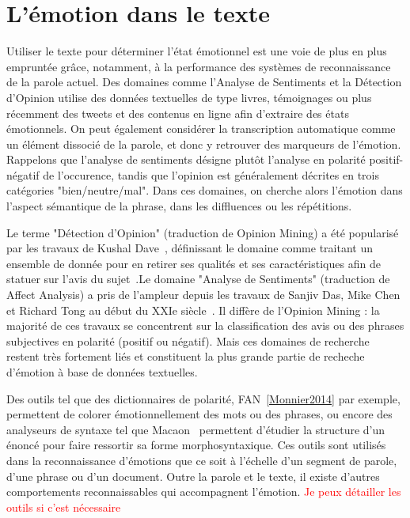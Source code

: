 \section{L'émotion dans le texte}
Utiliser le texte pour déterminer l'état émotionnel est une voie de plus en plus empruntée grâce, notamment, à la performance des systèmes de reconnaissance de la parole actuel.
Des domaines comme l'Analyse de Sentiments et la Détection d'Opinion utilise des données textuelles de type livres, témoignages ou plus récemment des tweets et  des contenus en ligne afin d'extraire des états émotionnels. On peut également considérer la transcription automatique comme un élément dissocié de la parole, et donc y retrouver des marqueurs de l'émotion. Rappelons que l’analyse de sentiments désigne plutôt l’analyse en polarité positif-négatif de l'occurence, tandis que l'opinion est généralement décrites en trois catégories "bien/neutre/mal". Dans ces domaines, on cherche alors l'émotion dans l'aspect sémantique de la phrase, dans les diffluences ou les répétitions.

Le terme "Détection d'Opinion" (traduction de Opinion Mining) a été popularisé par les travaux de Kushal Dave~\cite{Dave2003}, définissant le domaine comme traitant un ensemble de donnée pour en retirer ses qualités et ses caractéristiques afin de statuer sur l'avis du sujet~\cite{Pang2008}.Le domaine "Analyse de Sentiments" (traduction de Affect Analysis) a pris de l'ampleur depuis les travaux de Sanjiv Das, Mike Chen et Richard Tong au début du XXIe siècle~\cite{Das2007,Tong2001}. Il diffère de l'Opinion Mining : la majorité de ces travaux se concentrent sur la classification des avis ou des phrases subjectives en polarité (positif ou négatif). Mais ces domaines de recherche restent très fortement liés et constituent la plus grande partie de recheche d'émotion à base de données textuelles.

Des outils tel que des dictionnaires de polarité, FAN~\ref{Monnier2014} par exemple, permettent de colorer émotionnellement des mots ou des phrases, ou encore des analyseurs de syntaxe tel que Macaon~\cite{Nasr2011} permettent d'étudier la structure d'un énoncé pour faire ressortir sa forme morphosyntaxique. Ces outils sont utilisés dans la reconnaissance d'émotions que ce soit à l'échelle d'un segment de parole, d'une phrase ou d'un document. Outre la parole et le texte, il existe d'autres comportements reconnaissables qui accompagnent l'émotion.
\textcolor{red}{Je peux détailler les outils si c'est nécessaire}

